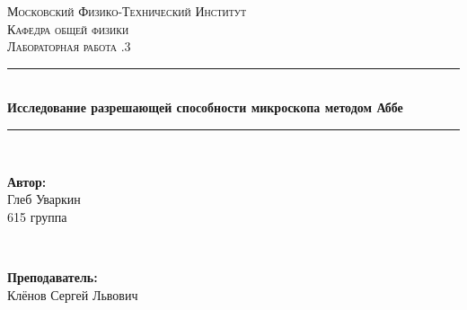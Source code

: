 \documentclass[a4paper, 12pt, twoside]{article}
\begin{document}
	\begin{titlepage}
		
		\newcommand{\HRule}{\rule{\linewidth}{0.7mm}} %
		
		\center %
		
		
		\textsc{\LARGE Московский Физико-Технический Институт}\\[1,5cm] %
		\textsc{\Large Кафедра общей физики}\\[0.5cm] %
		\textsc{\large Лабораторная работа .3}\\[0.5cm] %
		
		
		\HRule
		\\[0.4cm]
		{ \huge \bfseries Исследование разрешающей способности микроскопа методом Аббе}
		\\[0.2cm] %
		\HRule
		\\[1.5cm]
		
		
		
		
		\begin{minipage}{0.4\textwidth}
			\begin{flushleft} \large
				\textbf{Автор:}\\
				Глеб Уваркин \\
				615 группа
			\end{flushleft}
		\end{minipage}
		~
		\begin{minipage}{0.4\textwidth}
			\begin{flushright} \large
				\textbf {Преподаватель:} \\
				Клёнов Сергей Львович %
			\end{flushright}
		\end{minipage}
		

\end{titlepage}
\end{document}

